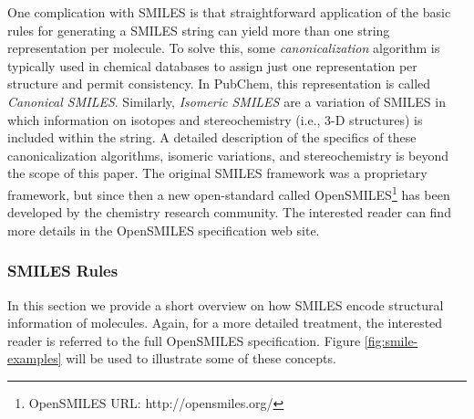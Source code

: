 One complication with SMILES is that straightforward application of the basic rules for generating a SMILES string can yield more than one string representation per molecule. To solve this, some {\em canonicalization} algorithm is typically used in chemical databases to  assign just one representation per structure and permit consistency. In PubChem, this representation is called {\em Canonical SMILES}. Similarly, 
{\em Isomeric SMILES} are a variation of SMILES in which information on isotopes and stereochemistry (i.e., 3-D structures) is included within the string. A detailed description of the specifics of these canonicalization algorithms, isomeric variations, and stereochemistry is beyond the scope of this paper. The original SMILES framework was a proprietary framework, but since then a new open-standard called OpenSMILES\footnote{OpenSMILES URL: http://opensmiles.org/} has been developed by the chemistry research community. The interested reader can find more details in the OpenSMILES specification web site. 
%
    \subsubsection{SMILES Rules\label{rules}}
    In this section we provide a short overview on how SMILES encode structural information of molecules. Again, for a more detailed treatment, the interested reader is referred to the full OpenSMILES specification. Figure \ref{fig:smile-examples} will be used to illustrate some of these concepts.
    
